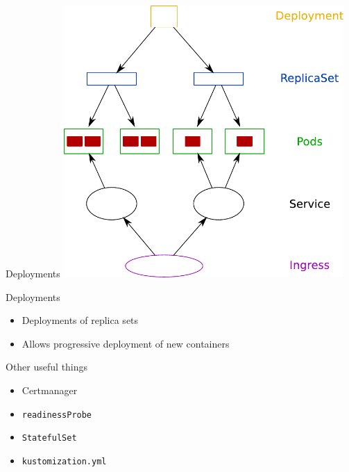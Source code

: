 \documentclass{dcpresentation}
\begin{document}
 
 \begin{frame}{Deployments}
  \centering
  \includegraphics[width=0.8\textwidth]{img/arch-psird.pdf}
 \end{frame}

 \begin{frame}{Deployments}
  \begin{itemize}
   \item Deployments of replica sets
   \item Allows progressive deployment of new containers
  \end{itemize}
 \end{frame}
 
 \begin{frame}{Other useful things}
  \begin{itemize}
   \item Certmanager
   \item \texttt{readinessProbe}
   \item \texttt{StatefulSet}
   \item \texttt{kustomization.yml}
  \end{itemize}
 \end{frame}
\end{document}
